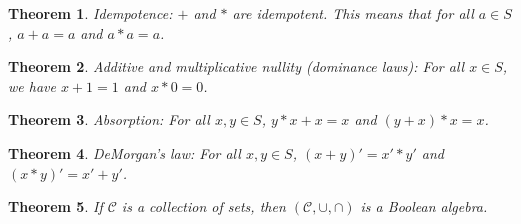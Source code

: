 \documentclass[a4paper]{article}
\newtheorem{mytheorem}{Theorem}
\numberwithin{mytheorem}{section}
\numberwithin{mydef}{section}
\numberwithin{axiom}{section}
\numberwithin{example}{section}
\begin{document}
\begin{mytheorem} Idempotence: $+$ and $*$ are idempotent. This means that for all $a \in S$, $a + a = a$ and $a * a = a$.
\end{mytheorem}

\begin{mytheorem} Additive and multiplicative nullity (dominance laws): For all $x \in S$, we have $x + 1 = 1$ and $x * 0 = 0$.
\end{mytheorem}

\begin{mytheorem} Absorption: For all $x,y \in S$, $y*x + x = x$ and $(y+x)*x = x$.
\end{mytheorem}

\begin{mytheorem} DeMorgan's law: For all $x,y \in S$, $(x+y)' = x' * y'$ and $(x*y)' = x' + y'$.
\end{mytheorem}

\begin{mytheorem} If $\mathcal{C}$ is a collection of sets, then $(\mathcal{C},\cup,\cap)$ is a Boolean algebra.
\end{mytheorem}


\end{document}
